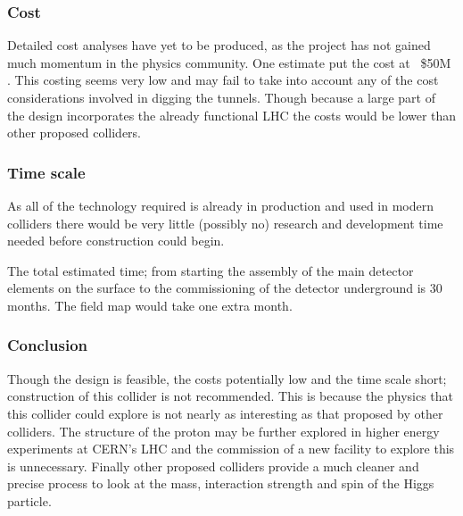 \subsubsection{Cost}

Detailed cost analyses have yet to be produced, as the project has not gained much momentum in the physics community. One estimate put the cost at ~\$50M \cite{LHeC:Zimmermann}. This costing seems very low and may fail to take into account any of the cost considerations involved in digging the tunnels. Though because a large part of the design incorporates the already functional LHC the costs would be lower than other proposed colliders.
 
 
\subsubsection{Time scale}

As all of the technology required is already in production and used in modern colliders there would be very little (possibly no) research and development time needed before construction could begin.
 
The total estimated time; from starting the assembly of the main detector elements on the surface to the commissioning of the detector underground is 30 months. The field map would take one extra month.
 
\subsubsection{Conclusion}

Though the design is feasible, the costs potentially low and the time scale short; construction of this collider is not recommended. This is because the physics that this collider could explore is not nearly as interesting as that proposed by other colliders. The structure of the proton may be further explored in higher energy experiments at CERN’s LHC and the commission of a new facility to explore this is unnecessary. Finally other proposed colliders provide a much cleaner and precise process to look at the mass, interaction strength and spin of the Higgs particle.